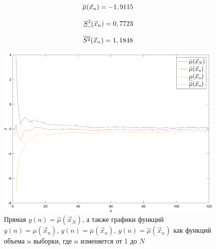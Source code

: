 \documentclass[12pt]{report}
\begin{document}
\begin{equation*}
	\overline\mu(\vec x_n) = -1,9115\\
\end{equation*}

\begin{equation*}
	\underline{S^2}(\vec x_n) = 0,7723\\
\end{equation*}

\begin{equation*}
	\overline{S^2}(\vec x_n) = 1,1848\\
\end{equation*}

\begin{figure}[h]
	\centering
	\includegraphics[scale=0.5]{img/1.png}
	\caption{Прямая $y(n) = \hat\mu(\vec x_N)$, а также графики функций $y(n) = \underline\mu(\vec x_n)$, $y(n) = \overline\mu(\vec x_n)$, $y(n) = \hat\mu(\vec x_n)$ как функций объема $n$ выборки, где $n$ изменяется от 1 до $N$}
	\label{fig:1}
\end{figure}
\end{document}
